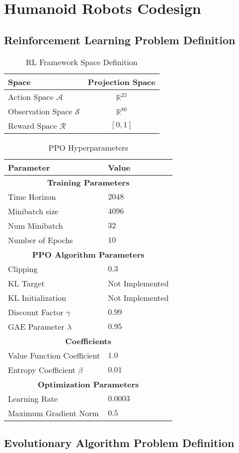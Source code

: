 \chapter{Humanoid Robots Codesign}
\label{chp:07-Codesign}



\section{Reinforcement Learning Problem Definition}

\lipsum[1]

\begin{table}[]
    \centering
    \begin{tabular}{l c}
        \toprule
        Space & Projection Space \\
        \midrule
        Action Space $\mathcal{A}$ & $\mathbb{R} ^{23}$\\
        Observation Space $\mathcal{S}$ & $\mathbb{R} ^{80}$ \\
        Reward Space $\mathcal{R}$ & $[0,1]$ \\
        \bottomrule
    \end{tabular}
    \caption{RL Framework Space Definition}
    \label{tab:rlspacedef}
\end{table}


\begin{table}[h]
\centering
\begin{tabular}{ll}
\toprule
\textbf{Parameter} & \textbf{Value} \\
\midrule
\multicolumn{2}{c}{\textbf{Training Parameters}} \\
Time Horizon & $2048$ \\
Minibatch size & $4096$ \\
Num Minibatch & $32$ \\
Number of Epochs & $10$ \\
\midrule
\multicolumn{2}{c}{\textbf{PPO Algorithm Parameters}} \\
Clipping & $0.3$ \\
KL Target & Not Implemented \\
KL Initialization & Not Implemented \\
Discount Factor $\gamma$ & $0.99$ \\
GAE Parameter $\lambda$ & $0.95$ \\
\midrule
\multicolumn{2}{c}{\textbf{Coefficients}} \\
Value Function Coefficient & $1.0$ \\
Entropy Coefficient $\beta$ & $0.01$ \\
\midrule
\multicolumn{2}{c}{\textbf{Optimization Parameters}} \\
Learning Rate & $0.0003$ \\
Maximum Gradient Norm & $0.5$ \\
\bottomrule
\end{tabular}
\caption{PPO Hyperparameters}
\end{table}


\section{Evolutionary Algorithm Problem Definition}


